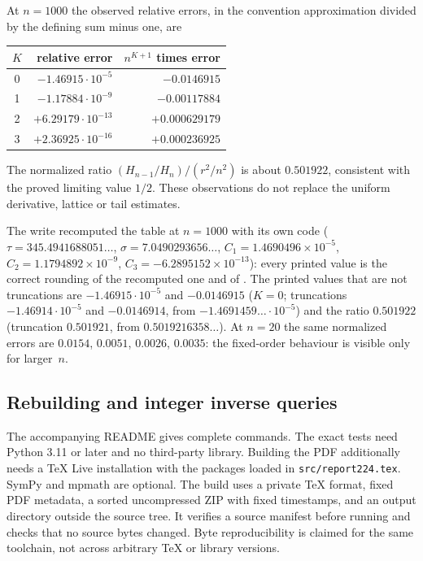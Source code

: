 At $n=1000$ the observed relative errors, in the convention approximation divided by the defining sum minus one, are
\begin{center}
\begin{tabular}{c r r}
\toprule
$K$ & relative error & $n^{K+1}$ times error\\
\midrule
0&$-1.46915\cdot10^{-5}$&$-0.0146915$\\
1&$-1.17884\cdot10^{-9}$&$-0.00117884$\\
2&$+6.29179\cdot10^{-13}$&$+0.000629179$\\
3&$+2.36925\cdot10^{-16}$&$+0.000236925$\\
\bottomrule
\end{tabular}
\end{center}
The normalized ratio $(H_{n-1}/H_n)/(r^2/n^2)$ is about $0.501922$, consistent with the proved limiting value $1/2$. These observations do not replace the uniform derivative, lattice or tail estimates.
\begin{writenote}
The write recomputed the table at $n=1000$ with its own code ($\tau=345.4941688051\ldots$,
$\sigma=7.0490293656\ldots$, $C_1=1.4690496\times10^{-5}$,
$C_2=1.1794892\times10^{-9}$, $C_3=-6.2895152\times10^{-13}$): every printed
value is the correct rounding of the recomputed one and of
. The printed values that are not
truncations are $-1.46915\cdot10^{-5}$ and $-0.0146915$ ($K=0$; truncations
$-1.46914\cdot10^{-5}$ and $-0.0146914$, from $-1.4691459\ldots\cdot10^{-5}$)
and the ratio $0.501922$ (truncation $0.501921$, from $0.5019216358\ldots$).
At $n=20$ the same normalized errors are $0.0154$, $0.0051$, $0.0026$,
$0.0035$: the fixed-order behaviour is visible only for larger~$n$.
\end{writenote}

\subsection{Rebuilding and integer inverse queries}
The accompanying README gives complete commands. The exact tests need Python 3.11 or later and no third-party library. Building the PDF additionally needs a TeX Live installation with the packages loaded in \texttt{src/report224.tex}. SymPy and mpmath are optional. The build uses a private TeX format, fixed PDF metadata, a sorted uncompressed ZIP with fixed timestamps, and an output directory outside the source tree. It verifies a source manifest before running and checks that no source bytes changed. Byte reproducibility is claimed for the same toolchain, not across arbitrary TeX or library versions.

